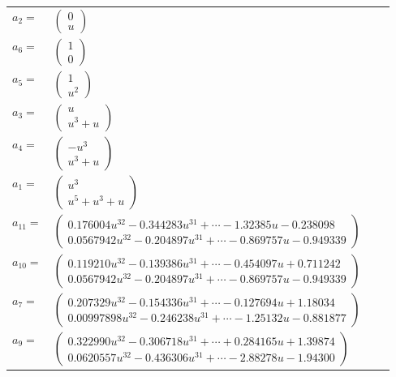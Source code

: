 \documentclass[1p]{elsarticle_modified}
\theoremstyle{definition}
\begin{document}
\begin{tabular}{m{7pt} m{180pt} m{7pt} m{180pt} }
\flushright $a_{2}=$&$\begin{pmatrix}0\\u\end{pmatrix}$ \\
\flushright $a_{6}=$&$\begin{pmatrix}1\\0\end{pmatrix}$ \\
\flushright $a_{5}=$&$\begin{pmatrix}1\\u^2\end{pmatrix}$ \\
\flushright $a_{3}=$&$\begin{pmatrix}u\\u^3+u\end{pmatrix}$ \\
\flushright $a_{4}=$&$\begin{pmatrix}- u^3\\u^3+u\end{pmatrix}$ \\
\flushright $a_{1}=$&$\begin{pmatrix}u^3\\u^5+u^3+u\end{pmatrix}$ \\
\flushright $a_{11}=$&$\begin{pmatrix}0.176004 u^{32}-0.344283 u^{31}+\cdots-1.32385 u-0.238098\\0.0567942 u^{32}-0.204897 u^{31}+\cdots-0.869757 u-0.949339\end{pmatrix}$ \\
\flushright $a_{10}=$&$\begin{pmatrix}0.119210 u^{32}-0.139386 u^{31}+\cdots-0.454097 u+0.711242\\0.0567942 u^{32}-0.204897 u^{31}+\cdots-0.869757 u-0.949339\end{pmatrix}$ \\
\flushright $a_{7}=$&$\begin{pmatrix}0.207329 u^{32}-0.154336 u^{31}+\cdots-0.127694 u+1.18034\\0.00997898 u^{32}-0.246238 u^{31}+\cdots-1.25132 u-0.881877\end{pmatrix}$ \\
\flushright $a_{9}=$&$\begin{pmatrix}0.322990 u^{32}-0.306718 u^{31}+\cdots+0.284165 u+1.39874\\0.0620557 u^{32}-0.436306 u^{31}+\cdots-2.88278 u-1.94300\end{pmatrix}$ \\

\end{tabular}
\end{document}
